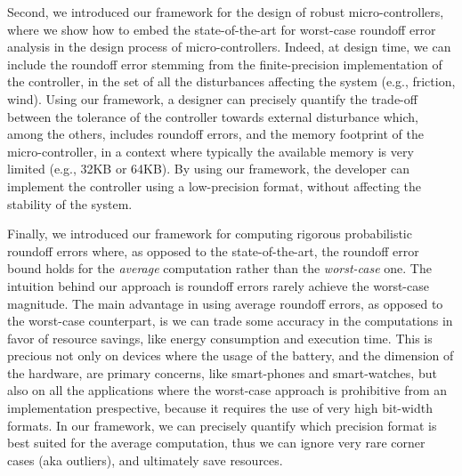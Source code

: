Second, we introduced our framework for the design of robust micro-controllers, where we show how to embed the state-of-the-art for worst-case roundoff error analysis in the design process of micro-controllers.
%
Indeed, at design time, we can include the roundoff error stemming from the finite-precision implementation of the controller, in the set of all the disturbances affecting the system (e.g., friction, wind).
%
Using our framework, a designer can precisely quantify the trade-off between the tolerance of the controller towards external disturbance which, among the others, includes roundoff errors, and the memory footprint of the micro-controller, in a context where typically the available memory is very limited (e.g., 32KB or 64KB).
%
By using our framework, the developer can implement the controller using a low-precision format, without affecting the stability of the system.
%
%
%

Finally, we introduced our framework for computing rigorous probabilistic roundoff errors where, as opposed to the state-of-the-art, the roundoff error bound holds for the \emph{average} computation rather than the \emph{worst-case} one.
%
The intuition behind our approach is roundoff errors rarely achieve the worst-case magnitude. 
%
The main advantage in using average roundoff errors, as opposed to the worst-case counterpart, is we can trade some accuracy in the computations in favor of resource savings, like energy consumption and execution time.
%
This is precious not only on devices where the usage of the battery, and the dimension of the hardware, are primary concerns, like smart-phones and smart-watches, but also on all the applications where the worst-case approach is prohibitive from an implementation prespective, because it requires the use of very high bit-width formats. 
%
In our framework, we can precisely quantify which precision format is best suited for the average computation, thus we can ignore very rare corner cases (aka outliers), and ultimately save resources.
%